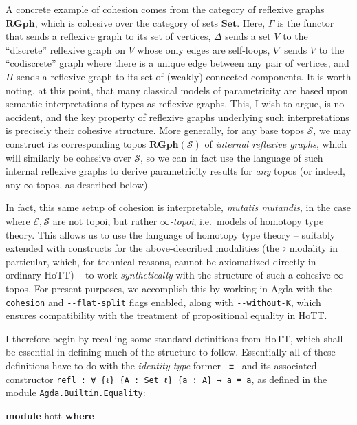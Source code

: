 \documentclass[
  12pt]{article}
\newenvironment{Shaded}{\begin{snugshade}}{\end{snugshade}}
\newcommand{\KeywordTok}[1]{\textcolor[rgb]{0.12,0.11,0.11}{\textbf{#1}}}
\newcommand{\NormalTok}[1]{\textcolor[rgb]{0.12,0.11,0.11}{#1}}
\begin{document}
A concrete example of cohesion comes from the category of reflexive
graphs \(\mathbf{RGph}\), which is cohesive over the category of sets
\(\mathbf{Set}\). Here, \(\Gamma\) is the functor that sends a reflexive
graph to its set of vertices, \(\Delta\) sends a set \(V\) to the
``discrete'' reflexive graph on \(V\) whose only edges are self-loops,
\(\nabla\) sends \(V\) to the ``codiscrete'' graph where there is a
unique edge between any pair of vertices, and \(\Pi\) sends a reflexive
graph to its set of (weakly) connected components. It is worth noting,
at this point, that many classical models of parametricity are based
upon semantic interpretations of types as reflexive graphs. This, I wish
to argue, is no accident, and the key property of reflexive graphs
underlying such interpretations is precisely their cohesive structure.
More generally, for any base topos \(\mathcal{S}\), we may construct its
corresponding topos \(\mathbf{RGph}(\mathcal{S})\) of \emph{internal
reflexive graphs}, which will similarly be cohesive over
\(\mathcal{S}\), so we can in fact use the language of such internal
reflexive graphs to derive parametricity results for \emph{any} topos
(or indeed, any \(\infty\)-topos, as described below).

In fact, this same setup of cohesion is interpretable, \emph{mutatis
mutandis}, in the case where \(\mathcal{E,S}\) are not topoi, but rather
\emph{\(\infty\)-topoi}, i.e.~models of homotopy type theory. This
allows us to use the language of homotopy type theory -- suitably
extended with constructs for the above-described modalities (the
\(\flat\) modality in particular, which, for technical reasons, cannot
be axiomatized directly in ordinary HoTT) -- to work
\emph{synthetically} with the structure of such a cohesive
\(\infty\)-topos. For present purposes, we accomplish this by working in
Agda with the \texttt{-\/-cohesion} and \texttt{-\/-flat-split} flags
enabled, along with \texttt{-\/-without-K}, which ensures compatibility
with the treatment of propositional equality in HoTT.

I therefore begin by recalling some standard definitions from HoTT,
which shall be essential in defining much of the structure to follow.
Essentially all of these definitions have to do with the \emph{identity
type} former \texttt{\_≡\_} and its associated constructor
\texttt{refl\ :\ ∀\ \{ℓ\}\ \{A\ :\ Set\ ℓ\}\ \{a\ :\ A\}\ →\ a\ ≡\ a},
as defined in the module \texttt{Agda.Builtin.Equality}:

\begin{Shaded}
\begin{Highlighting}[]
\KeywordTok{module}\NormalTok{ hott }\KeywordTok{where}
\end{Highlighting}
\end{Shaded}
\end{document}
